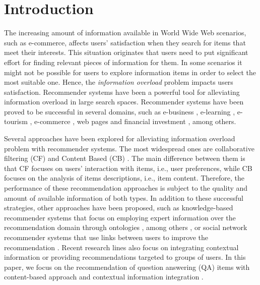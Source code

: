 \documentclass[preprint]{elsarticle}
\providecommand{\revise}[1]{{\protect\textcolor{REVISE}{\uwave{#1}}}}%
\begin{document}
\begin{spacing}{1.5}
\begin{frontmatter}
\end{frontmatter}

\section{Introduction}\label{sec:introduction}

The increasing amount of information available in World Wide Web scenarios, such as e-commerce, affects users' satisfaction when they search for items that meet their interests. This situation originates that users need to put significant effort for finding relevant pieces of information for them. In some scenarios it might not be possible for users to explore information items in order to select the most suitable one. Hence, the \emph{information overload} problem impacts users satisfaction. Recommender systems have been a powerful tool for alleviating information overload in large search spaces. Recommender systems have been proved to be successful in several domains, such as e-business \cite{Lu2013}, e-learning \cite{Wu2015,Yera2014}, e-tourism \cite{AlHassan2015,Noguera2012}, e-commerce \cite{Rafailidis2016}, web pages \cite{Nguyen2014,Xuan2015} and financial investment \cite{Musto2015}, among others.

Several approaches have been explored for alleviating information overload problem with recommender systems. The most widespread ones are collaborative filtering (CF) \cite{Koren2015} and Content Based (CB) \cite{deGemmis2015}. The main difference between them is that CF focuses on users' interaction with items, i.e., user preferences, while CB focuses on the analysis of items descriptions, i.e., item content. Therefore, the performance of these recommendation approaches is subject to the quality and amount of available information of both types. In addition to these successful strategies, other approaches have been proposed, such as knowledge-based recommender systems that focus on employing expert information over the recommendation domain through ontologies \cite{Nilashi2018}, among others \cite{Colombo2015,Wu2015}, or social network recommender systems that use links between users to improve the recommendation \cite{Deng2014}. Recent research lines also focus on integrating contextual information \cite{Adomavicius2015} or providing recommendations targeted to groups of users\cite{Castro2017,Masthoff2015}. In this paper, we focus on the recommendation of question answering (QA) items with content-based approach and contextual information integration \cite{Kuchmann2015}. \revise{Luis: (Big Data)}


\end{spacing}
\end{document}
